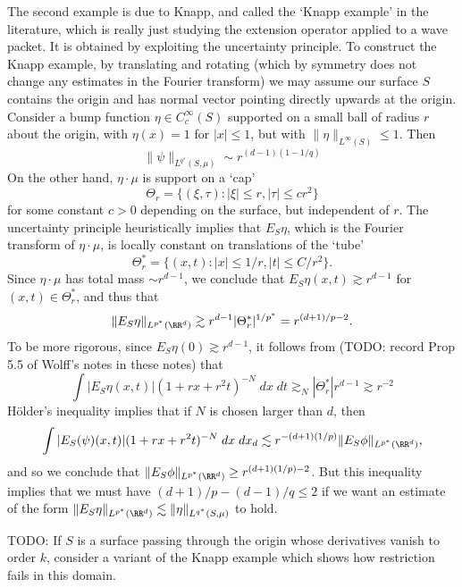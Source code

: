 The second example is due to Knapp, and called the `Knapp example' in the literature, which is really just studying the extension operator applied to a wave packet. It is obtained by exploiting the uncertainty principle. To construct the Knapp example, by translating and rotating (which by symmetry does not change any estimates in the Fourier transform) we may assume our surface $S$ contains the origin and has normal vector pointing directly upwards at the origin. Consider a bump function $\eta \in C_c^\infty(S)$ supported on a small ball of radius $r$ about the origin, with $\eta(x) = 1$ for $|x| \leq 1$, but with $\| \eta \|_{L^\infty(S)} \leq 1$. Then
%
\[ \| \psi \|_{L^{q^*}(S,\mu)} \sim r^{(d-1)(1 - 1/q)} \]
%
On the other hand, $\eta \cdot \mu$ is support on a `cap'
%
\[ \Theta_r = \{ (\xi,\tau) : |\xi| \leq r, |\tau| \leq c r^2 \} \]
%
for some constant $c > 0$ depending on the surface, but independent of $r$. The uncertainty principle heuristically implies that $E_S \eta$, which is the Fourier transform of $\eta \cdot \mu$, is locally constant on translations of the `tube'
%
\[ \Theta_r^* = \{ (x,t) : |x| \leq 1/r, |t| \leq C/r^2 \}. \]
%
Since $\eta \cdot \mu$ has total mass $\sim r^{d-1}$, we conclude that $E_S \eta(x,t) \gtrsim r^{d-1}$ for $(x,t) \in \Theta_r^*$, and thus that
%
\[ \| E_S \eta \|_{L^{p^*}(\RR^d)} \gtrsim r^{d-1} |\Theta_r^*|^{1/p^*} = r^{(d+1)/p - 2}. \]
%
To be more rigorous, since $E_S \eta(0) \gtrsim r^{d-1}$, it follows from (TODO: record Prop 5.5 of Wolff's notes in these notes) that
%
\[ \int |E_S \eta(x,t)| (1 + rx + r^2t)^{-N}\; dx\; dt \gtrsim_N |\Theta_r^*| r^{d-1} \gtrsim r^{-2} \]
%
H\"{o}lder's inequality implies that if $N$ is chosen larger than $d$, then
%
\begin{align*}
  \int |E_S(\psi)(x,t)| (1 + rx + r^2 t)^{-N}\; dx\; dx_d \lesssim r^{-(d+1)(1/p)} \| E_S \phi \|_{L^{p^*}(\RR^d)},
\end{align*}
%
and so we conclude that $\| E_S \phi \|_{L^{p^*}(\RR^d)} \geq r^{(d+1)(1/p) - 2}$. But this inequality implies that we must have $(d+1)/p - (d-1)/q \leq 2$ if we want an estimate of the form $\| E_S \eta \|_{L^{p^*}(\RR^d)} \lesssim \| \eta \|_{L^{q^*}(S,\mu)}$ to hold.

\begin{remark}
  TODO: If $S$ is a surface passing through the origin whose derivatives vanish to order $k$, consider a variant of the Knapp example which shows how restriction fails in this domain.
\end{remark}

